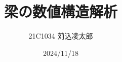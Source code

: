 \documentclass[uplatex]{jsarticle}
\begin{document}
\title{梁の数値構造解析}
\author{21C1034 苅込凌太郎}
\date{2024/11/18}%
\maketitle




\end{document}
